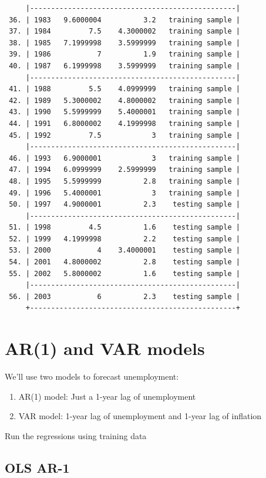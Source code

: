 \documentclass[
]{book}
\providecommand{\tightlist}{%
  \setlength{\itemsep}{0pt}\setlength{\parskip}{0pt}}
\begin{document}
\begin{verbatim}
     |-------------------------------------------------|
 36. | 1983   9.6000004          3.2   training sample |
 37. | 1984         7.5    4.3000002   training sample |
 38. | 1985   7.1999998    3.5999999   training sample |
 39. | 1986           7          1.9   training sample |
 40. | 1987   6.1999998    3.5999999   training sample |
     |-------------------------------------------------|
 41. | 1988         5.5    4.0999999   training sample |
 42. | 1989   5.3000002    4.8000002   training sample |
 43. | 1990   5.5999999    5.4000001   training sample |
 44. | 1991   6.8000002    4.1999998   training sample |
 45. | 1992         7.5            3   training sample |
     |-------------------------------------------------|
 46. | 1993   6.9000001            3   training sample |
 47. | 1994   6.0999999    2.5999999   training sample |
 48. | 1995   5.5999999          2.8   training sample |
 49. | 1996   5.4000001            3   training sample |
 50. | 1997   4.9000001          2.3    testing sample |
     |-------------------------------------------------|
 51. | 1998         4.5          1.6    testing sample |
 52. | 1999   4.1999998          2.2    testing sample |
 53. | 2000           4    3.4000001    testing sample |
 54. | 2001   4.8000002          2.8    testing sample |
 55. | 2002   5.8000002          1.6    testing sample |
     |-------------------------------------------------|
 56. | 2003           6          2.3    testing sample |
     +-------------------------------------------------+
\end{verbatim}

\section{AR(1) and VAR models}\label{ar1-and-var-models}

We'll use two models to forecast unemployment:

\begin{enumerate}
\def\labelenumi{\arabic{enumi}.}
\tightlist
\item
  AR(1) model: Just a 1-year lag of unemployment
\item
  VAR model: 1-year lag of unemployment and 1-year lag of inflation
\end{enumerate}

Run the regressions using training data

\subsection*{OLS AR-1}\label{ols-ar-1}
\end{document}
